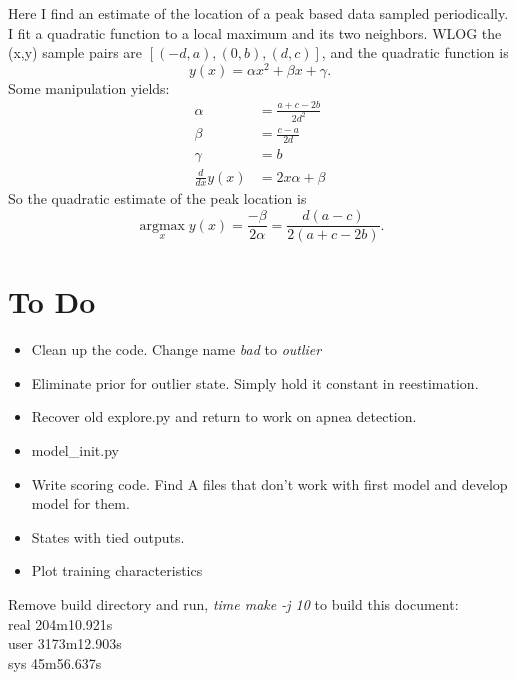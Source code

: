 \documentclass[12pt]{article}
\newcommand{\argmax}{\operatorname*{argmax}}
\begin{document}
Here I find an estimate of the location of a peak based data sampled
periodically.  I fit a quadratic function to a local maximum and its
two neighbors.  WLOG the (x,y) sample pairs are $[(-d,a), (0,b),
(d,c)]$, and the quadratic function is
\begin{equation*}
  y(x) = \alpha x^2 + \beta x + \gamma.
\end{equation*}
Some manipulation yields:
\begin{align*}
  \alpha &= \frac{a+c-2b}{2d^2} \\
  \beta &= \frac{c-a}{2d} \\
  \gamma &= b \\
  \frac{d}{dx} y(x) &= 2x\alpha + \beta
\end{align*}
So the quadratic estimate of the peak location is
\begin{equation*}
  \argmax_x y(x) = \frac{-\beta}{2\alpha} = \frac{d(a-c)}{2(a+c-2b)}.
\end{equation*}

\section{To Do}
\label{sec:todo}

\begin{itemize}
\item Clean up the code.  Change name \emph{bad} to \emph{outlier}
\item Eliminate prior for outlier state.  Simply hold it constant in
  reestimation.
\item Recover old explore.py and return to work on apnea detection.
\item model\_init.py
\item Write scoring code.  Find A files that don't work with first
  model and develop model for them.
\item States with tied outputs.
\end{itemize}

\begin{itemize}
\item Plot training characteristics
\end{itemize}

Remove build directory and run, \emph{time make -j 10} to build this
document:\\
%
real	204m10.921s\\
%
user	3173m12.903s\\
%
sys	45m56.637s
\end{document}
